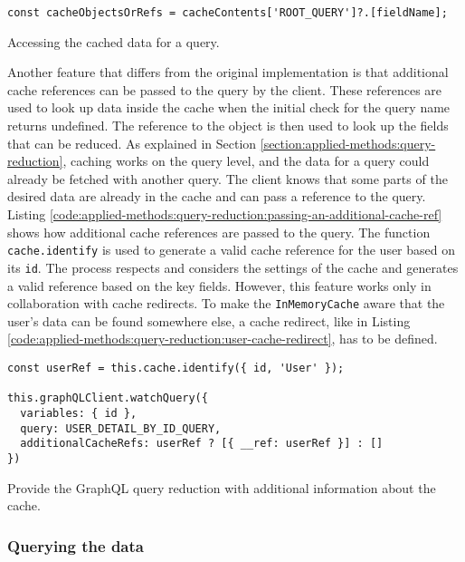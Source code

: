 \ifshowListings
\begin{listing}[H]
\begin{verbatim}
const cacheObjectsOrRefs = cacheContents['ROOT_QUERY']?.[fieldName];
\end{verbatim}
\caption{Accessing the cached data for a query.}\label{code:applied-methods:query-reduction:getting-cache-content}
\end{listing}
\fi

\noindent Another feature that differs from the original implementation is that additional cache references can be passed to the query by the client. These references are used to look up data inside the cache when the initial check for the query name returns undefined. The reference to the object is then used to look up the fields that can be reduced. As explained in Section \ref{section:applied-methods:query-reduction}, caching works on the query level, and the data for a query could already be fetched with another query. The client knows that some parts of the desired data are already in the cache and can pass a reference to the query. Listing \ref{code:applied-methods:query-reduction:passing-an-additional-cache-ref} shows how additional cache references are passed to the query. The function \texttt{cache.identify} is used to generate a valid cache reference for the user based on its \texttt{id}. The process respects and considers the settings of the cache and generates a valid reference based on the key fields. However, this feature works only in collaboration with cache redirects. To make the \texttt{InMemoryCache} aware that the user's data can be found somewhere else, a cache redirect, like in Listing \ref{code:applied-methods:query-reduction:user-cache-redirect}, has to be defined.

\ifshowListings
\begin{listing}[H]
\begin{verbatim}
const userRef = this.cache.identify({ id, 'User' });

this.graphQLClient.watchQuery({
  variables: { id },
  query: USER_DETAIL_BY_ID_QUERY,
  additionalCacheRefs: userRef ? [{ __ref: userRef }] : []
})
\end{verbatim}
\caption{Provide the GraphQL query reduction with additional information about the cache.}\label{code:applied-methods:query-reduction:passing-an-additional-cache-ref}
\end{listing}
\fi

\subsubsection{Querying the data}

